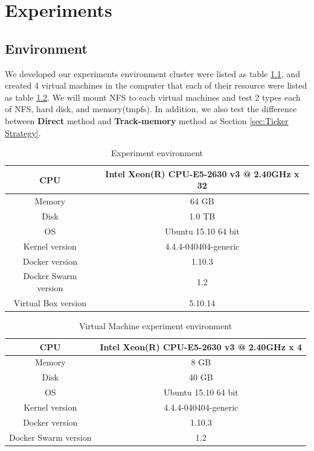 \chapter{Experiments}
\label{chap:experiments}
\section{Environment}
We developed our experiments environment cluster were listed as table \ref{table:Host}, and created 4 virtual machines in the computer that each of their resource were listed as table \ref{table:Virtual Machine}. We will mount NFS to each virtual machines and test 2 types each of NFS, hard disk, and memory(tmpfs). 
In addition, we also test the difference between \textbf{Direct} method  and \textbf{Track-memory} method as Section \ref{sec:Ticker Strategy}.

\begin{table}[hbtp]
\begin{center}
\begin{tabular}{|c|c|} \hline
CPU & Intel Xeon(R) CPU-E5-2630 v3 @ 2.40GHz x 32 \\ \hline
Memory & 64 GB \\ \hline
Disk & 1.0 TB \\ \hline
OS & Ubuntu 15.10 64 bit \\ \hline
Kernel version & 4.4.4-040404-generic \\ \hline
Docker version & 1.10.3 \\ \hline
Docker Swarm version & 1.2 \\ \hline
Virtual Box version & 5.10.14 \\ \hline
\end{tabular}
\end{center}
\caption{Experiment environment}
\label{table:Host}
\end{table}

\begin{table}[hbtp]
\begin{center}
\begin{tabular}{|c|c|} \hline
CPU & Intel Xeon(R) CPU-E5-2630 v3 @ 2.40GHz x 4 \\ \hline
Memory & 8 GB \\ \hline
Disk & 40 GB \\ \hline
OS & Ubuntu 15.10 64 bit \\ \hline
Kernel version & 4.4.4-040404-generic \\ \hline
Docker version & 1.10.3 \\ \hline
Docker Swarm version & 1.2 \\ \hline
\end{tabular}
\end{center}
\caption{Virtual Machine experiment environment}
\label{table:Virtual Machine}
\end{table}

